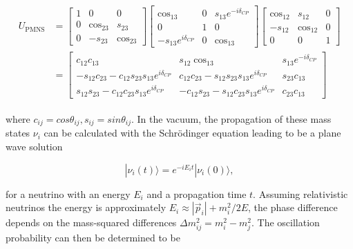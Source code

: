 \documentclass[a4paper,12pt,numbered]{article}
\begin{document}
\begin{align}
\begin{split}
    U_{\text{PMNS}} &= 
    \begin{bmatrix}
        1 & 0 & 0 \\
        0 & \cos_{23} & s_{23} \\
        0 & -s_{23} & \cos_{23}
    \end{bmatrix}
    \begin{bmatrix}
        \cos_{13} & 0 & s_{13} e^{-i\delta_{CP}} \\
        0 & 1 & 0 \\
        -s_{13} e^{i\delta_{CP}} & 0 & \cos_{13}
    \end{bmatrix}
    \begin{bmatrix}
        \cos_{12} & s_{12} & 0 \\
        -s_{12} & \cos_{12} & 0 \\
        0 & 0 & 1
    \end{bmatrix}
    \\
    &=
    \begin{bmatrix}
        c_{12} c_{13} & s_{12} \cos_{13} & s_{13} e^{-i\delta_{CP}} \\
        -s_{12} c_{23} - c_{12} s_{23} s_{13} e^{i\delta_{CP}} & 
        c_{12} c_{23} - s_{12} s_{23} s_{13} e^{i\delta_{CP}} & 
        s_{23} c_{13} \\
        s_{12} s_{23} - c_{12} c_{23} s_{13} e^{i\delta_{CP}} & 
        -c_{12} s_{23} - s_{12} c_{23} s_{13} e^{i\delta_{CP}} & 
        c_{23} c_{13}
    \end{bmatrix}
\end{split}
\end{align}

where $c_{ij}=cos\theta_{ij}, s_{ij}=sin\theta_{ij}$. In the vacuum, the propagation of these mass states $\nu_i$ can be calculated with the Schrödinger equation leading to be a plane wave solution

\begin{equation}
    |\nu_i(t)\rangle = e^{-i E_i t} |\nu_i(0)\rangle,
\end{equation}

for a neutrino with an energy $E_i$ and a propagation time $t$. Assuming relativistic neutrinos the energy is approximately $E_i \approx |\vec{p}_i| + m_i^2 / 2E$, the phase difference depends on the mass-squared differences $\Delta m_{ij}^2 = m_i^2 - m_j^2$. The oscillation probability can then be determined to be
\end{document}
